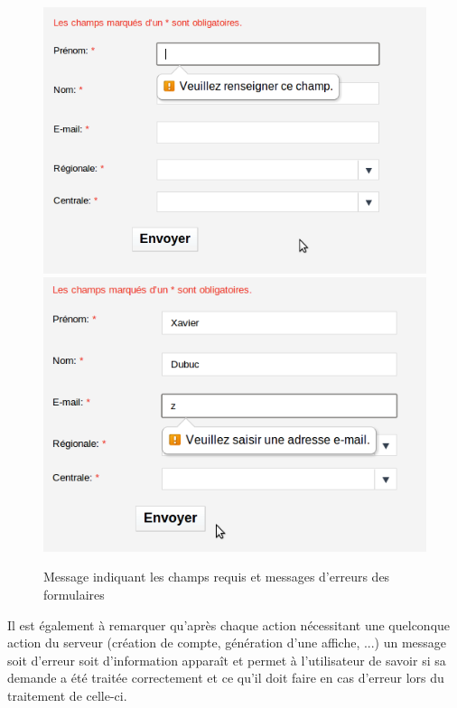 \documentclass{article}
\begin{document}
\begin{sffamily}
\begin{figure}[h!]
	\begin{center}
		\includegraphics[scale=0.4]{ergo_011.png}
		\includegraphics[scale=0.4]{ergo_012.png}
		\caption{Message indiquant les champs requis et messages d'erreurs des formulaires}
	\end{center}
\end{figure}

Il est également à remarquer qu'après chaque action nécessitant une quelconque action du serveur (création de compte, génération d'une affiche, 
...) un message soit d'erreur soit d'information apparaît et permet à l'utilisateur de savoir si sa demande a été traitée correctement et ce qu'il 
doit faire en cas d'erreur lors du traitement de celle-ci.


\end{sffamily}
\end{document}
